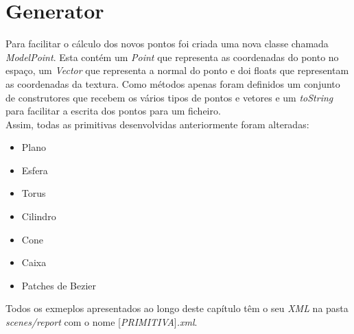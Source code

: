 \documentclass[a4paper]{report}
\begin{document}
\chapter{Generator}
Para facilitar o cálculo dos novos pontos foi criada uma nova classe chamada
\textit{ModelPoint}. Esta contém um \textit{Point} que representa as
coordenadas do ponto no espaço, um \textit{Vector} que representa a normal do
ponto e doi floats que representam as coordenadas da textura. Como métodos
apenas foram definidos um conjunto de construtores que recebem os vários tipos
de pontos e vetores e um \textit{toString} para facilitar a escrita dos pontos
para um ficheiro.\\
Assim, todas as primitivas desenvolvidas anteriormente foram alteradas:
\begin{itemize}
        \item Plano
        \item Esfera
        \item Torus
        \item Cilindro
        \item Cone
        \item Caixa
        \item Patches de Bezier
\end{itemize}
Todos os exmeplos apresentados ao longo deste capítulo têm o seu \textit{XML} na
pasta \textit{scenes/report} com o nome [\textit{PRIMITIVA}]\textit{.xml}.
\end{document}
